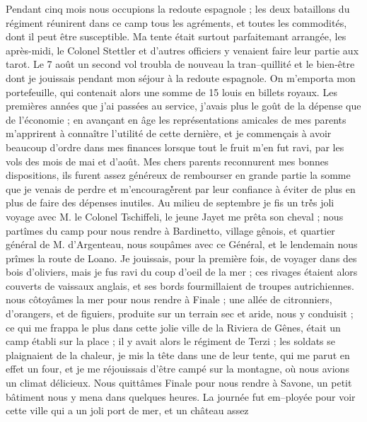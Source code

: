 \documentclass[12pt]{article}
\begin{document}
 Pendant cinq mois nous occupions la redoute espagnole ;
les deux bataillons du régiment réunirent dans ce camp tous les agréments, et toutes les commodités,
dont il peut être susceptible. Ma tente était surtout parfaitemant arrangée, les après-midi, le
Colonel Stettler et d’autres officiers y venaient faire leur partie aux tarot. Le 7 août un second
vol troubla de nouveau la tran–quillité et le bien-être dont je jouissais pendant mon séjour à la
redoute espagnole. On m’emporta mon portefeuille, qui contenait alors une somme de 15 louis en
billets royaux. Les premières années que j’ai passées au service, j’avais plus le goût de la dépense
que de l’économie ; en avançant en âge les représentations amicales de mes parents m’apprirent à
connaître l’utilité de cette dernière, et je commençais à avoir beaucoup d’ordre dans mes finances
lorsque tout le fruit m’en fut ravi, par les vols des mois de mai et d’août. Mes chers parents
reconnurent mes bonnes dispositions, ils furent assez généreux de rembourser en grande partie la
somme que je venais de perdre et m’encouragè́rent par leur confiance à éviter de plus en plus de
faire des dépenses inutiles. Au milieu de septembre je fis un trè́s joli voyage avec M. le Colonel
Tschiffeli, le jeune Jayet me prêta son cheval ; nous partîmes du camp pour nous rendre à
Bardinetto, village gênois, et quartier général de M. d’Argenteau, nous soupâmes avec ce Général, et
le lendemain nous prîmes la route de Loano. Je jouissais, pour la première fois, de voyager dans des
bois d’oliviers, mais je fus ravi du coup d’oeil de la mer ; ces rivages étaient alors couverts de
vaissaux anglais, et ses bords fourmillaient de troupes autrichiennes. nous côtoyâmes la mer pour
nous rendre à Finale ; une allée de citronniers, d’orangers, et de figuiers, produite sur un terrain
sec et aride, nous y conduisit ; ce qui me frappa le plus dans cette jolie ville de la Riviera de
Gênes, était un camp établi sur la place ; il y avait alors le régiment de Terzi ; les soldats se
plaignaient de la chaleur, je mis la tête dans une de leur tente, qui me parut en effet un four, et
je me réjouissais d’être campé sur la montagne, où nous avions un climat délicieux. Nous quittâmes
Finale pour nous rendre à Savone, un petit bâtiment nous y mena dans quelques heures. La journée fut
em–ployée pour voir cette ville qui a un joli port de mer, et un château assez
\end{document}
